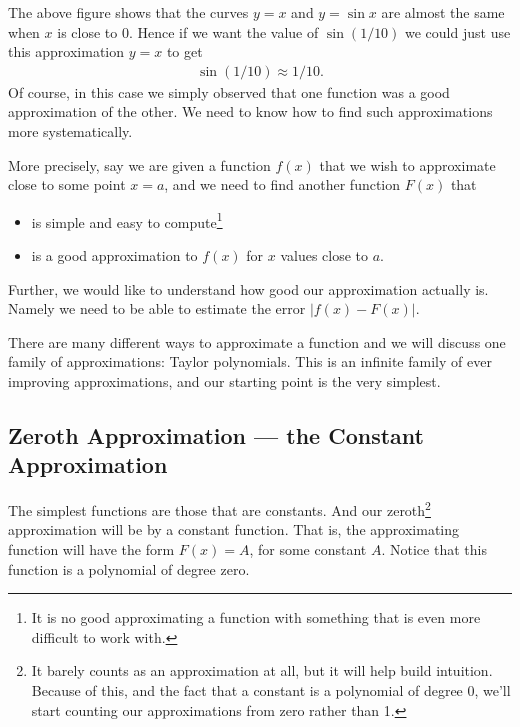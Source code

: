 \begin{fig}
 \begin{center}
 \end{center}
\end{fig}
The above figure shows that the curves $y=x$ and $y=\sin x$ are almost the same
when $x$ is close to $0$. Hence if we want the value of
$\sin(1/10)$ we could just use this approximation $y=x$ to get
\begin{align*}
  \sin(1/10) \approx 1/10.
\end{align*}
Of course, in this case we simply observed that one function was a good
approximation of the other. We need to know how to find such approximations
more systematically.

More precisely, say we are given a function $f(x)$ that we wish to approximate
close to some point $x=a$, and we need to find another function $F(x)$
that
\begin{itemize}
 \item is simple and easy to compute\footnote{It is no good approximating a
function with something that is even more difficult to work with.}
 \item is a good approximation to $f(x)$ for $x$ values close to $a$.
\end{itemize}
Further, we would like to understand how good our approximation actually is.
Namely we need to be able to estimate the error $|f(x)-F(x)|$.

There are many different ways to approximate a function and we will discuss one
family of approximations: Taylor polynomials. This is an infinite family of
ever improving approximations, and our starting point is the very simplest.


\subsection{Zeroth Approximation --- the Constant Approximation}\label{ssec const approx}
The simplest functions are those that are constants. And our
zeroth\footnote{It barely counts as an approximation at all, but it will help
build intuition. Because of this, and the fact that a constant is a
polynomial of degree 0,  we'll start counting our approximations from zero
rather than 1.} approximation will be by a constant function. That is, the
approximating function will have the form $F(x)=A$, for some constant $A$.
Notice that this function is a polynomial of degree zero.


